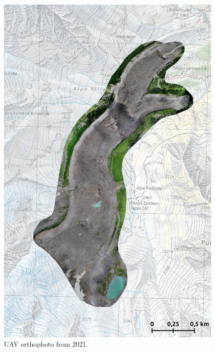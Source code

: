 \begin{figure}[p]
    \centering
    \includegraphics[height=\textheight]{figures/appendix/orto_2021.jpg}
    \caption{UAV orthophoto from 2021.}
\end{figure}

